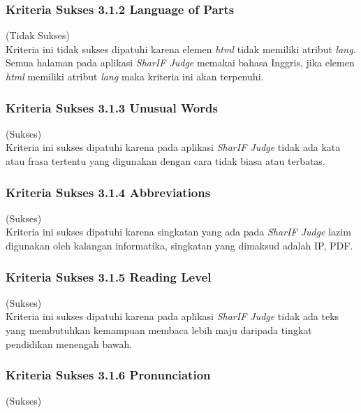 \documentclass[a4paper,twoside]{article}
\begin{document}
\begin{enumerate}
		\subsubsection*{Kriteria Sukses 3.1.2 Language of Parts}
		\label{subsubsec:kepatuhan_kriteria_3.1.2}
		(Tidak Sukses) \\
		
		Kriteria ini tidak sukses dipatuhi karena elemen \textit{html} tidak memiliki atribut \textit{lang}. Semua halaman pada aplikasi \textit{SharIF Judge} memakai bahasa Inggris, jika elemen \textit{html} memiliki atribut \textit{lang} maka kriteria ini akan terpenuhi.
		
		\subsubsection*{Kriteria Sukses 3.1.3 Unusual Words}
		\label{subsubsec:kepatuhan_kriteria_3.1.3}
		(Sukses) \\
		
		Kriteria ini sukses dipatuhi karena pada aplikasi \textit{SharIF Judge} tidak ada kata atau frasa tertentu yang digunakan dengan cara tidak biasa atau terbatas. 
		
		\subsubsection*{Kriteria Sukses 3.1.4 Abbreviations}
		\label{subsubsec:kepatuhan_kriteria_3.1.4}
		(Sukses) \\
		
		Kriteria ini sukses dipatuhi karena singkatan yang ada pada \textit{SharIF Judge} lazim digunakan oleh kalangan informatika, singkatan yang dimaksud adalah IP, PDF.
		
		\subsubsection*{Kriteria Sukses 3.1.5 Reading Level}
		\label{subsubsec:kepatuhan_kriteria_3.1.5}
		(Sukses) \\
		
		Kriteria ini sukses dipatuhi karena pada aplikasi \textit{SharIF Judge} tidak ada teks yang membutuhkan kemampuan membaca lebih maju daripada tingkat pendidikan menengah bawah.
		
		\subsubsection*{Kriteria Sukses 3.1.6 Pronunciation}
		\label{subsubsec:kepatuhan_kriteria_3.1.6}
		(Sukses) \\
		

\end{enumerate}
\end{document}
